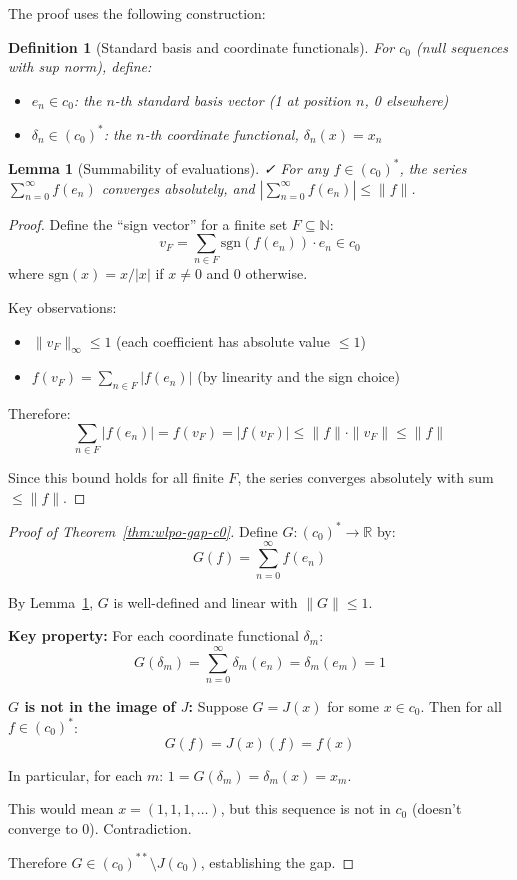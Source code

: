 \documentclass[11pt]{article}  %
\newtheorem{lemma}[theorem]{Lemma}
\newtheorem{definition}[theorem]{Definition}
\newenvironment{lem}{\begin{lemma}}{\end{lemma}}
\newenvironment{defi}{\begin{definition}}{\end{definition}}
\newcommand{\leanok}{\textsf{\small \textcolor{green!70!black}{✓}}}
\newcommand{\N}{\mathbb{N}}
\newcommand{\R}{\mathbb{R}}
\begin{document}
The proof uses the following construction:

\begin{defi}[Standard basis and coordinate functionals]
For $c_0$ (null sequences with sup norm), define:
\begin{itemize}
\item $e_n\in c_0$: the $n$-th standard basis vector (1 at position $n$, 0 elsewhere)
\item $\delta_n\in (c_0)^*$: the $n$-th coordinate functional, $\delta_n(x)=x_n$
\end{itemize}
\end{defi}

\begin{lem}[Summability of evaluations]\label{lem:summable}\leanok
For any $f\in (c_0)^*$, the series $\sum_{n=0}^{\infty} f(e_n)$ converges absolutely, and $|\sum_{n=0}^{\infty} f(e_n)|\le \|f\|$.
\end{lem}

\begin{proof}
Define the ``sign vector'' for a finite set $F\subseteq\N$:
\[
v_F = \sum_{n\in F} \mathrm{sgn}(f(e_n))\cdot e_n \in c_0
\]
where $\mathrm{sgn}(x)=x/|x|$ if $x\ne 0$ and $0$ otherwise.

Key observations:
\begin{itemize}
\item $\|v_F\|_{\infty}\le 1$ (each coefficient has absolute value $\le 1$)
\item $f(v_F)=\sum_{n\in F}|f(e_n)|$ (by linearity and the sign choice)
\end{itemize}

Therefore:
\[
\sum_{n\in F}|f(e_n)| = f(v_F) = |f(v_F)| \le \|f\|\cdot\|v_F\| \le \|f\|
\]

Since this bound holds for all finite $F$, the series converges absolutely with sum $\le\|f\|$.
\end{proof}

\begin{proof}[Proof of Theorem~\ref{thm:wlpo-gap-c0}]
Define $G:(c_0)^*\to\R$ by:
\[
G(f) = \sum_{n=0}^{\infty} f(e_n)
\]

By Lemma~\ref{lem:summable}, $G$ is well-defined and linear with $\|G\|\le 1$.

\textbf{Key property:} For each coordinate functional $\delta_m$:
\[
G(\delta_m) = \sum_{n=0}^{\infty} \delta_m(e_n) = \delta_m(e_m) = 1
\]

\textbf{$G$ is not in the image of $J$:} Suppose $G=J(x)$ for some $x\in c_0$. Then for all $f\in(c_0)^*$:
\[
G(f) = J(x)(f) = f(x)
\]

In particular, for each $m$: $1 = G(\delta_m) = \delta_m(x) = x_m$.

This would mean $x=(1,1,1,\ldots)$, but this sequence is not in $c_0$ (doesn't converge to 0). Contradiction.

Therefore $G\in(c_0)^{**}\setminus J(c_0)$, establishing the gap.
\end{proof}
\end{document}
